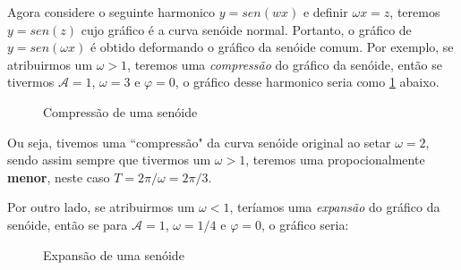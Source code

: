 Agora considere o seguinte harmonico $y = sen(wx)$ e definir $\omega x = z$, teremos
$y = sen(z)$ cujo gráfico é a curva senóide normal. Portanto, o gráfico de 
$y = sen(\omega x)$ é obtido deformando o gráfico da senóide comum. Por exemplo,
se atribuirmos um $\omega > 1$, teremos uma \textit{compressão} do gráfico da
senóide, então se tivermos $\mathcal{A} = 1$, $\omega = 3$ e $\varphi = 0$, o gráfico 
desse harmonico seria como \ref{fig:compSen} abaixo.

\begin{figure}[H]
    \caption{Compressão de uma senóide}
    \label{fig:compSen}
\end{figure}

Ou seja, tivemos uma ``compressão" da curva senóide original ao setar $\omega = 2$,
sendo assim sempre que tivermos um $\omega > 1$, teremos uma propocionalmente
\textbf{menor}, neste caso $T = 2\pi / \omega = 2\pi / 3$.

Por outro lado, se atribuirmos um $\omega < 1$, teríamos uma \textit{expansão}
do gráfico da senóide, então se para $\mathcal{A} = 1$, $\omega = 1/4$ e $\varphi = 0$,
o gráfico seria:
\begin{figure}[H]
    \caption{Expansão de uma senóide}
    \label{fig:expSen}
\end{figure}


